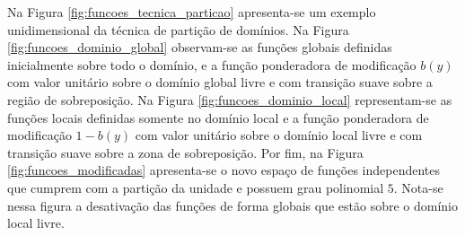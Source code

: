 Na Figura \ref{fig:funcoes_tecnica_particao} apresenta-se um exemplo unidimensional da técnica de partição de domínios. Na Figura \ref{fig:funcoes_dominio_global} observam-se as funções globais definidas inicialmente sobre todo o domínio, e a função ponderadora de modificação $b(y)$ com valor unitário sobre o domínio global livre e com transição suave sobre a região de sobreposição. Na Figura \ref{fig:funcoes_dominio_local} representam-se as funções locais definidas somente no domínio local e a função ponderadora de modificação $1-b(y)$ com valor unitário sobre o domínio local livre e com transição suave sobre a zona de sobreposição. Por fim, na Figura \ref{fig:funcoes_modificadas} apresenta-se o novo espaço de funções independentes que cumprem com a partição da unidade e possuem grau polinomial $5$. Nota-se nessa figura a desativação das funções de forma globais que estão sobre o domínio local livre.

